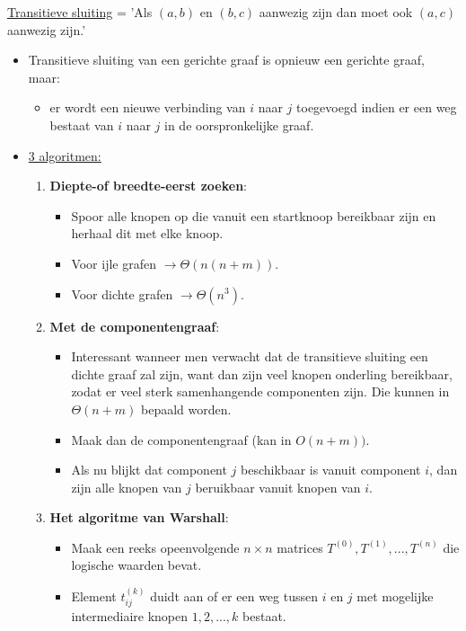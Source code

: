 \documentclass{report}
\begin{document}
\underline{Transitieve sluiting} = 'Als $(a, b)$ en $(b, c)$ aanwezig zijn dan moet ook $(a, c)$ aanwezig zijn.'

\begin{itemize}
	\item[\info] Transitieve sluiting van een gerichte graaf is opnieuw een gerichte graaf, maar:
	\begin{itemize}
		\item[\info] er wordt een nieuwe verbinding van $i$ naar $j$ toegevoegd indien er een weg bestaat van $i$ naar $j$ in de oorspronkelijke graaf.
	\end{itemize}
	\item \underline{3 algoritmen:}
	\begin{enumerate}
		\item \textbf{Diepte-of breedte-eerst zoeken}: 
				\begin{itemize}
					\item[\info] Spoor alle knopen op die vanuit een startknoop bereikbaar zijn en herhaal dit met elke knoop.
					\item[\good] Voor ijle grafen $\rightarrow \Theta(n(n + m))$.
					\item[\alert] Voor dichte grafen $\rightarrow \Theta(n^3)$.
				\end{itemize}
		\item \textbf{Met de componentengraaf}:
				\begin{itemize}
					\item[\info] Interessant wanneer men verwacht dat de transitieve sluiting een dichte graaf zal zijn, want dan zijn veel knopen onderling bereikbaar, zodat er veel sterk samenhangende componenten zijn. Die kunnen in $\Theta(n + m)$ bepaald worden.
					\item[\info] Maak dan de componentengraaf (kan in $O(n + m))$.
					\item[\info] Als nu blijkt dat component $j$ beschikbaar is vanuit component $i$, dan zijn alle knopen van $j$ beruikbaar vanuit knopen van $i$.
				\end{itemize}
		\item \textbf{Het algoritme van Warshall}:
				\begin{itemize}
					\item[\info] Maak een reeks opeenvolgende $n \times n$ matrices $T^{(0)},T^{(1)},...,T^{(n)}$ die logische waarden bevat.
					\item[\info] Element $t_{ij}^{(k)}$ duidt aan of er een weg tussen $i$ en $j$ met mogelijke intermediaire knopen $1, 2, ..., k$ bestaat.

\end{itemize}
\end{enumerate}
\end{itemize}
\end{document}
